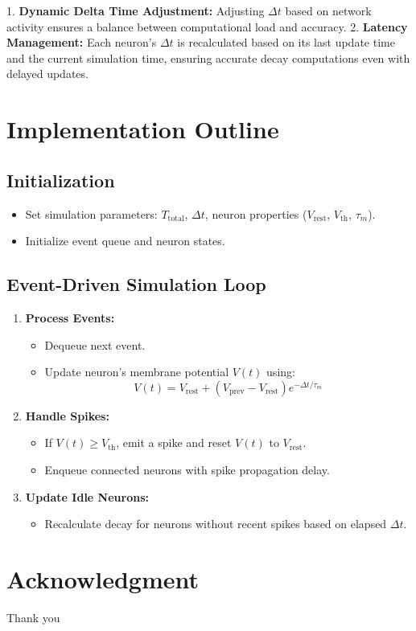\documentclass[journal]{IEEEtran}
\begin{document}
1. \textbf{Dynamic Delta Time Adjustment:} Adjusting $\Delta t$ based on network activity ensures a balance between computational load and accuracy.
2. \textbf{Latency Management:} Each neuron's $\Delta t$ is recalculated based on its last update time and the current simulation time, ensuring accurate decay computations even with delayed updates.



\section{Implementation Outline}
\subsection{Initialization}
\begin{itemize}
    \item Set simulation parameters: $T_{\text{total}}$, $\Delta t$, neuron properties ($V_{\text{rest}}$, $V_{\text{th}}$, $\tau_m$).
    \item Initialize event queue and neuron states.
\end{itemize}


\subsection{Event-Driven Simulation Loop}
\begin{enumerate}
    \item \textbf{Process Events:}
    \begin{itemize}
        \item Dequeue next event.
        \item Update neuron's membrane potential $V(t)$ using:
        \[ V(t) = V_{\text{rest}} + (V_{\text{prev}} - V_{\text{rest}}) e^{-\Delta t / \tau_m} \]
    \end{itemize}
    \item \textbf{Handle Spikes:}
    \begin{itemize}
        \item If $V(t) \geq V_{\text{th}}$, emit a spike and reset $V(t)$ to $V_{\text{rest}}$.
        \item Enqueue connected neurons with spike propagation delay.
    \end{itemize}
    \item \textbf{Update Idle Neurons:}
    \begin{itemize}
        \item Recalculate decay for neurons without recent spikes based on elapsed $\Delta t$.
    \end{itemize}
\end{enumerate}



\section*{Acknowledgment}
Thank you 

\begin{thebibliography}{1}


\end{thebibliography}
\end{document}
